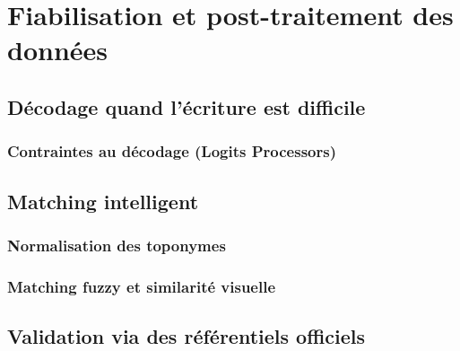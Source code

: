 \chapter{Fiabilisation et post-traitement des données}

\section{Décodage quand l'écriture est difficile}

\subsection{Contraintes au décodage (Logits Processors)}

\section{Matching intelligent}
\subsection{Normalisation des toponymes}

\subsection{Matching fuzzy et similarité visuelle}

\section{Validation via des référentiels officiels}

